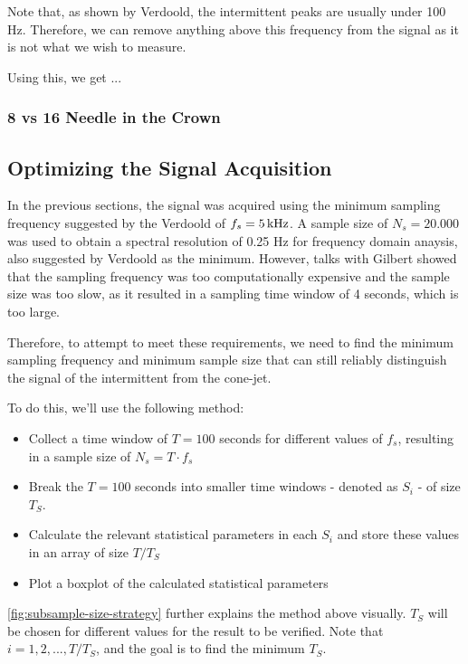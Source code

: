 \documentclass[oneside,12pt]{article}
\begin{document}
Note that, as shown by Verdoold, the intermittent peaks are usually under 100 Hz. Therefore, we can remove 
anything above this frequency from the signal as it is not what we wish to measure.

Using this, we get ...

\subsubsection{8 vs 16 Needle in the Crown}


\subsection{Optimizing the Signal Acquisition}

In the previous sections, the signal was acquired using the minimum sampling frequency
suggested by the Verdoold of $f_s = 5 \,\mathrm{kHz}$. A sample size of $N_s = 20.000$ was used to obtain a spectral resolution of 0.25 Hz
for frequency domain anaysis, also suggested by Verdoold as the minimum. However, talks with Gilbert showed that the sampling frequency was too
computationally expensive and the sample size was too slow, as it resulted in a sampling time window of 4 seconds, which is too large.

Therefore, to attempt to meet these requirements, we need to find the minimum sampling frequency and
minimum sample size that can still reliably distinguish the signal of the intermittent from the cone-jet.

To do this, we'll use the following method:

\begin{itemize}
    \item Collect a time window of $T = 100$ seconds for different values of $f_s$, resulting in a sample size of $N_s = T \cdot f_s$
    \item Break the $T = 100$ seconds into smaller time windows - denoted as $S_i$ - of size $T_S$. 
    \item Calculate the relevant statistical parameters in each $S_i$ and store these values in an array of size $T / T_S$
    \item Plot a boxplot of the calculated statistical parameters
\end{itemize}

\autoref{fig:subsample-size-strategy} further explains the method above visually. $T_S$ will be chosen for different values for the result to be verified. 
Note that $i = 1, 2, ..., T / T_S$, and the goal is to find the minimum $T_S$.
\end{document}
